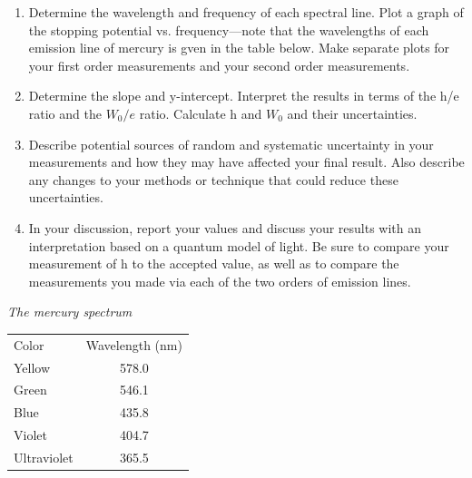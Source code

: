 \documentclass[11pt]{article}
\begin{document}
\begin{enumerate}

\item Determine the wavelength and frequency of each spectral line. Plot a graph
of the stopping potential vs. frequency---note that the wavelengths of each emission line
of mercury is gven in the table below. Make separate plots for your first
order measurements and your second order measurements.

\item Determine the slope and y-intercept. Interpret the results in terms of the
h/e ratio and the $W_0/e$ ratio. Calculate h and $W_0$ and their uncertainties.

\item Describe potential sources of random and systematic uncertainty in your measurements and how they may have affected your final result. Also describe any changes to your methods or technique that could reduce these uncertainties.

\item In your discussion, report your values and discuss your results with an
interpretation based on a quantum model of light. Be sure to compare your measurement of 
h to the accepted value, as well as to compare the measurements you made via each of the 
two orders of emission lines.

\end{enumerate}

\vspace{3mm}

\begin{center}
  {\it The mercury spectrum}
\end{center}

\begin{center}
\begin{tabular}{l c}
  Color & Wavelength (nm) \\
  Yellow & 578.0 \\
  Green & 546.1 \\
  Blue & 435.8 \\
  Violet & 404.7 \\
  Ultraviolet & 365.5 \\
\end{tabular}
\end{center}
\end{document}
